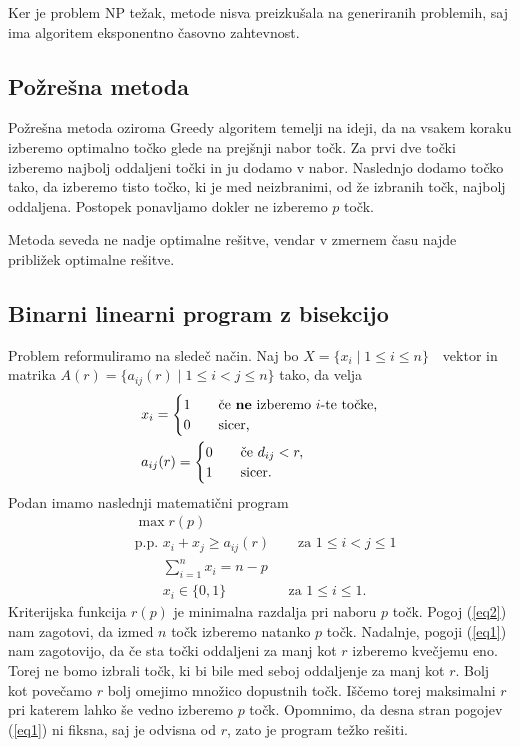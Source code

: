 \documentclass[a4paper]{article}
\begin{document}
Ker je problem NP težak, metode nisva preizkušala na generiranih problemih, saj ima algoritem
eksponentno časovno zahtevnost.

\subsection{Požrešna metoda}

Požrešna metoda oziroma Greedy algoritem temelji na ideji, da na vsakem koraku izberemo
optimalno točko glede na prejšnji nabor točk. Za prvi dve točki izberemo najbolj oddaljeni
točki in ju dodamo v nabor. Naslednjo dodamo točko tako, da izberemo tisto točko, ki je med 
neizbranimi, od že izbranih točk, najbolj oddaljena. Postopek ponavljamo dokler ne izberemo 
$ p $ točk.

Metoda seveda ne nadje optimalne rešitve, vendar v zmernem času najde približek optimalne 
rešitve.

\subsection{Binarni linearni program z bisekcijo}

Problem reformuliramo na sledeč način.
Naj bo $ X = \{ x_i \mid 1 \leq i \leq n \} \text{ } $ vektor in matrika 
$ A(r) = \{ a_{ij}(r) \mid 1 \leq i < j \leq n \} $ tako, da velja 
\begin{align*}
	& x_i = 
	\begin{cases}
		1 \quad & \text{če \textbf{ne} izberemo }i\text{-te točke,} \\
		0 \quad & \text{sicer,}
	\end{cases}	\\
	& a_{ij}(r) =
	\begin{cases}
		0 \quad & \text{če } d_{ij} < r, \\
		1 \quad & \text{sicer.}
	\end{cases}
\end{align*}
Podan imamo naslednji matematični program
\begin{align}
    & \max r(p) \nonumber \\
    & \text{p.p. } x_i + x_j \geq a_{ij}(r) \qquad \text{za } 1 \leq i < j \leq 1 \label{eq1} \\
    & \qquad \textstyle\sum_{i=1}^{n}x_i = n - p \label{eq2} \\
    & \qquad x_i \in \{ 0,1 \} \,\;\qquad\qquad \text{za } 1 \leq i \leq 1 \label{eq3}.
\end{align}
Kriterijska funkcija $ r(p) $ je minimalna razdalja pri naboru $ p $ točk. Pogoj (\ref{eq2})
nam zagotovi, da izmed $ n $ točk izberemo natanko $ p $ točk. Nadalnje, pogoji (\ref{eq1}) nam zagotovijo,
da če sta točki oddaljeni za manj kot $ r $  izberemo kvečjemu eno. Torej ne bomo izbrali točk, ki bi bile med seboj
oddaljenje za manj kot $ r $. Bolj kot povečamo $ r $ bolj omejimo množico dopustnih točk. Iščemo torej maksimalni $ r $ 
pri katerem lahko še vedno izberemo $ p $ točk. Opomnimo, da desna stran pogojev (\ref{eq1}) ni fiksna, saj
je odvisna od $ r $, zato je program težko rešiti.
\end{document}
